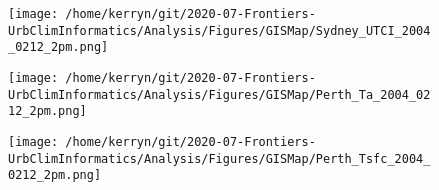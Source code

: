 \documentclass{article}
\begin{document}
\begin{figure}
\centering    
\texttt{[image: /home/kerryn/git/2020-07-Frontiers-UrbClimInformatics/Analysis/Figures/GISMap/Sydney\_UTCI\_2004\_0212\_2pm.png]}
\end{figure} 
\clearpage


\begin{figure}
\centering    
\texttt{[image: /home/kerryn/git/2020-07-Frontiers-UrbClimInformatics/Analysis/Figures/GISMap/Perth\_Ta\_2004\_0212\_2pm.png]}
\end{figure} 
\clearpage

\begin{figure}
\centering    
\texttt{[image: /home/kerryn/git/2020-07-Frontiers-UrbClimInformatics/Analysis/Figures/GISMap/Perth\_Tsfc\_2004\_0212\_2pm.png]}
\end{figure} 
\clearpage
\end{document}
